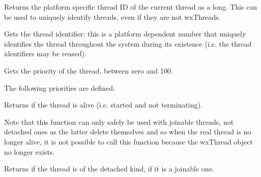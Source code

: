 

\label{wxthreadgetcurrentid}


Returns the platform specific thread ID of the current thread as a
long.  This can be used to uniquely identify threads, even if they are
not wxThreads.


\label{wxthreadgetid}


Gets the thread identifier: this is a platform dependent number that uniquely identifies the
thread throughout the system during its existence (i.e. the thread identifiers may be reused).


\label{wxthreadgetpriority}


Gets the priority of the thread, between zero and 100.

The following priorities are defined:

\twocolwidtha{7cm}
\begin{twocollist}\itemsep=0pt
\end{twocollist}


\label{wxthreadisalive}


Returns \true if the thread is alive (i.e. started and not terminating).

Note that this function can only safely be used with joinable threads, not
detached ones as the latter delete themselves and so when the real thread is
no longer alive, it is not possible to call this function because
the wxThread object no longer exists.

\label{wxthreadisdetached}


Returns \true if the thread is of the detached kind, \false if it is a joinable
one.


\label{wxthreadismain}


